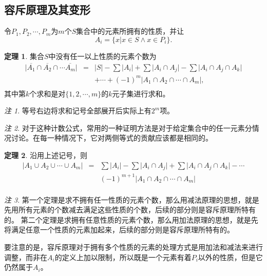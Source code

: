 \documentclass[a4paper,11pt]{article}%
\theoremstyle{remark}
\newtheorem*{remark}{注}
\theoremstyle{remark}
\theoremstyle{definition}
\newtheorem{theorem}{定理}[section]
\theoremstyle{definition}
\theoremstyle{definition}
\newcommand*{\abs}[1]{\lvert #1 \rvert}
\begin{document}
\subsection{容斥原理及其变形}
令$P_1,P_2,\cdots,P_m$为$m$个$S$集合中的元素所拥有的性质，并让
\[A_i=\{x|x\in S\land x\in P_i\}.\]
\begin{theorem}
    集合$S$中没有任一以上性质的元素个数为
    \[\begin{array}{rcl}
    \abs{\overline{A_1}\cap\overline{A_2}\cap\cdots\overline{A_m}}&=&\abs{S}-\sum\abs{A_i}+\sum\abs{A_i\cap A_j}-\sum\abs{A_i\cap A_j\cap A_k}\\
    &&+\cdots+(-1)^m\abs{A_1\cap A_2\cap \cdots \cap A_m},\\
    \end{array}\]
    其中第$k$个求和是对$\{1,2,\cdots,m\}$的$k$元子集进行求和。
\end{theorem}
\begin{remark}
    等号右边将求和记号全部展开后实际上有$2^m$项。
\end{remark}
\begin{remark}
    对于这种计数公式，常用的一种证明方法是对于给定集合中的任一元素分情况讨论。在每一种情况下，它对两侧等式的贡献应该都是相同的。
\end{remark}
\begin{theorem}
    沿用上述记号，则
    \[
    \begin{array}{rcl}
        \abs{A_1\cup A_2\cup\cdots\cup A_m}&=&\sum\abs{A_i}-\sum\abs{A_i\cap A_j}+\sum\abs{A_i\cap A_j\cap A_k}-\cdots \\
                                            && (-1)^{m+1}\abs{A_1\cap A_2\cap \cdots\cap A_m}\\
    \end{array}    
    \]
\end{theorem}
\begin{remark}
    第一个定理是求不拥有任一性质的元素个数，那么用减法原理的思想，就是先用所有元素的个数减去满足这些性质的个数，后续的部分则是容斥原理所特有的。
    第二个定理是求拥有任意性质的元素个数，那么用加法原理的思想，就是先将满足任意一个性质的元素加起来，后续的部分则是容斥原理所特有的。
    
    要注意的是，容斥原理对于拥有多个性质的元素的处理方式是用加法和减法来进行调整，而非在$A_i$的定义上加以限制，所以既是一个元素有着$P_i$以外的性质，但是它仍然属于$A_i$。 
\end{remark}
\end{document}
